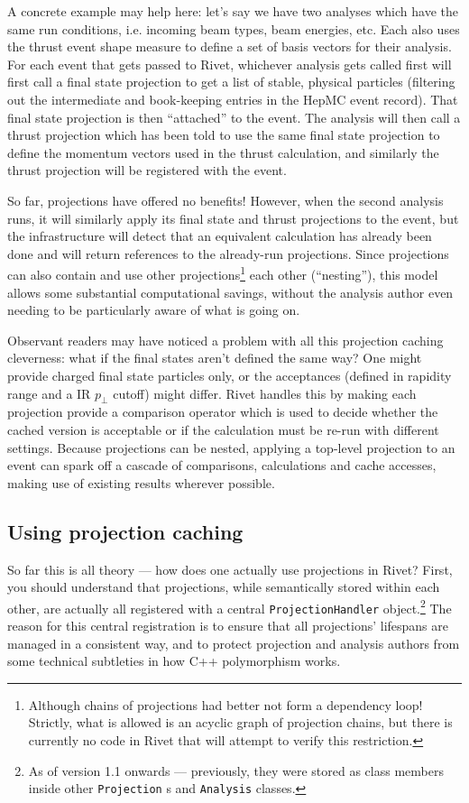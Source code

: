 \documentclass{JHEP3}
\newcommand{\code}[1]{\texttt{#1}\xspace}
\newcommand{\pT}{\ensuremath{p_\perp}\xspace}
\begin{document}
A concrete example may help here: let's say we have two analyses which
have the same run conditions, i.e. incoming beam types, beam energies, etc. Each
also uses the thrust event shape measure to define a set of basis vectors for
their analysis. For each event that gets passed to Rivet, whichever analysis
gets called first will first call a final state projection to get a list of
stable, physical particles (filtering out the intermediate and book-keeping
entries in the HepMC event record). That final state projection is then
``attached'' to the event. The analysis will then call a thrust projection which
has been told to use the same final state projection to define the momentum
vectors used in the thrust calculation, and similarly the thrust projection will
be registered with the event.

So far, projections have offered no benefits! However, when the second analysis
runs, it will similarly apply its final state and thrust projections to the
event, but the infrastructure will detect that an equivalent calculation has
already been done and will return references to the already-run
projections. Since projections can also contain and use other
projections\footnote{Although chains of projections had better not form a
  dependency loop! Strictly, what is allowed is an acyclic graph of projection
  chains, but there is currently no code in Rivet that will attempt to verify
  this restriction.} each other (``nesting''), this model allows some substantial
computational savings, without the analysis author even needing to be
particularly aware of what is going on.

Observant readers may have noticed a problem with all this projection caching
cleverness: what if the final states aren't defined the same way? One might
provide charged final state particles only, or the acceptances (defined in
rapidity range and a IR \pT cutoff) might differ. Rivet handles this by
making each projection provide a comparison operator which is used to decide
whether the cached version is acceptable or if the calculation must be re-run
with different settings. Because projections can be nested, applying a top-level
projection to an event can spark off a cascade of comparisons, calculations and
cache accesses, making use of existing results wherever possible.

\subsection{Using projection caching}
So far this is all theory --- how does one actually use projections in Rivet?
First, you should understand that projections, while semantically stored within
each other, are actually all registered with a central \code{ProjectionHandler}
object.\footnote{As of version 1.1 onwards --- previously, they were stored as
  class members inside other \code{Projection}s and \code{Analysis} classes.}
The reason for this central registration is to ensure that all projections'
lifespans are managed in a consistent way, and to protect projection and
analysis authors from some technical subtleties in how C++ polymorphism works.
\end{document}
